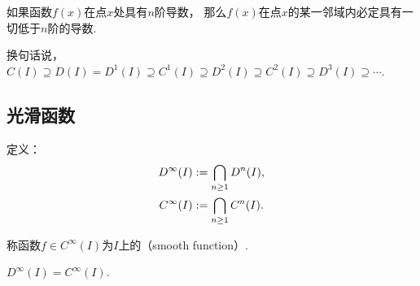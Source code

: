 \begin{theorem}
如果函数\(f(x)\)在点\(x\)处具有\(n\)阶导数，
那么\(f(x)\)在点\(x\)的某一邻域内必定具有一切低于\(n\)阶的导数.
\end{theorem}
换句话说，\(C(I) \supseteq
D(I) = D^1(I) \supseteq
C^1(I) \supseteq
D^2(I) \supseteq
C^2(I) \supseteq
D^3(I) \supseteq
\dotsb\).

\subsection{光滑函数}
\begin{definition}\label{definition:函数族.光滑函数族}
定义：\begin{gather*}
	D^\infty (I) := \bigcap_{n\geq1} D^n(I), \\
	C^\infty (I) := \bigcap_{n\geq1} C^n(I).
\end{gather*}

称函数\(f \in C^\infty (I)\)为\(I\)上的（smooth function）.
\end{definition}

\begin{property}\label{theorem:函数族.光滑函数族的性质1}
\(D^\infty (I) = C^\infty (I)\).
\end{property}
